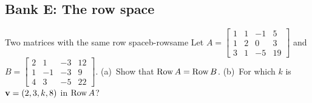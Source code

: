 \documentclass[11pt]{article}
\begin{document}
\subsection*{Bank E: The row space}

\begin{exmp}{Two matrices with the same row space}{b-rowsame}
Let $A=\begin{bmatrix}1&1&-1&5\\1&2&0&3\\3&1&-5&19\end{bmatrix}$ and $B=\begin{bmatrix}2&1&-3&12\\1&-1&-3&9\\4&3&-5&22\end{bmatrix}$. (a)~Show that $\operatorname{Row} A=\operatorname{Row} B$. (b)~For which $k$ is $\mathbf{v}=(2,3,k,8)$ in $\operatorname{Row} A$?


\end{exmp}
\end{document}
